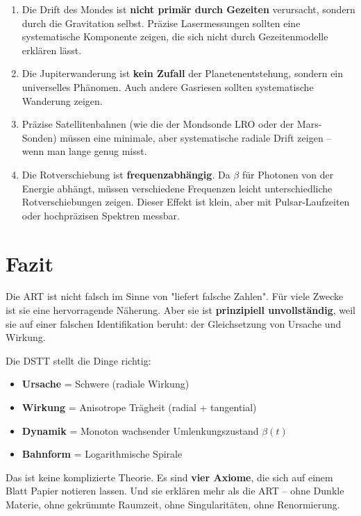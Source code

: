 \documentclass[12pt,a4paper]{article}
\begin{document}
\begin{enumerate}
    \item Die Drift des Mondes ist \textbf{nicht primär durch Gezeiten} verursacht, sondern durch die Gravitation selbst. Präzise Lasermessungen sollten eine systematische Komponente zeigen, die sich nicht durch Gezeitenmodelle erklären lässt.
    
    \item Die Jupiterwanderung ist \textbf{kein Zufall} der Planetenentstehung, sondern ein universelles Phänomen. Auch andere Gasriesen sollten systematische Wanderung zeigen.
    
    \item Präzise Satellitenbahnen (wie die der Mondsonde LRO oder der Mars-Sonden) müssen eine minimale, aber systematische radiale Drift zeigen – wenn man lange genug misst.
    
    \item Die Rotverschiebung ist \textbf{frequenzabhängig}. Da \(\beta\) für Photonen von der Energie abhängt, müssen verschiedene Frequenzen leicht unterschiedliche Rotverschiebungen zeigen. Dieser Effekt ist klein, aber mit Pulsar-Laufzeiten oder hochpräzisen Spektren messbar.
\end{enumerate}

\section{Fazit}

Die ART ist nicht falsch im Sinne von "liefert falsche Zahlen". Für viele Zwecke ist sie eine hervorragende Näherung. Aber sie ist \textbf{prinzipiell unvollständig}, weil sie auf einer falschen Identifikation beruht: der Gleichsetzung von Ursache und Wirkung.

Die DSTT stellt die Dinge richtig:

\begin{itemize}
    \item \textbf{Ursache} = Schwere (radiale Wirkung)
    \item \textbf{Wirkung} = Anisotrope Trägheit (radial + tangential)
    \item \textbf{Dynamik} = Monoton wachsender Umlenkungszustand \(\beta(t)\)
    \item \textbf{Bahnform} = Logarithmische Spirale
\end{itemize}

Das ist keine komplizierte Theorie. Es sind \textbf{vier Axiome}, die sich auf einem Blatt Papier notieren lassen. Und sie erklären mehr als die ART – ohne Dunkle Materie, ohne gekrümmte Raumzeit, ohne Singularitäten, ohne Renormierung.
\end{document}
